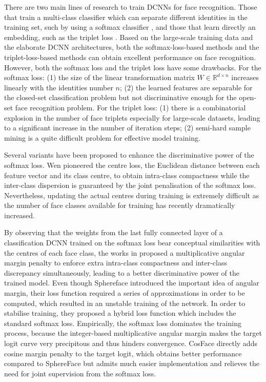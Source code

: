 \documentclass[10pt,twocolumn,letterpaper]{article}
\begin{document}
There are two main lines of research to train DCNNs for face recognition. Those that train a multi-class classifier which can separate different identities in the training set, such by using a softmax classifier \cite{taigman2014deepface,parkhi2015deep,cao2017vggface2}, and those that learn directly an embedding, such as the triplet loss \cite{schroff2015facenet}. Based on the large-scale training data and the elaborate DCNN architectures, both the softmax-loss-based methods \cite{cao2017vggface2} and the triplet-loss-based methods \cite{schroff2015facenet} can obtain excellent performance on face recognition. However, both the softmax loss and the triplet loss have some drawbacks. For the softmax loss: (1) the size of the linear transformation matrix $W \in \mathbb{R}^{d \times n}$ increases linearly with the identities number $n$; (2) the learned features are separable for the closed-set classification problem but not discriminative enough for the open-set face recognition problem. For the triplet loss: (1) there is a combinatorial explosion in the number of face triplets especially for large-scale datasets, leading to a significant increase in the number of iteration steps; (2) semi-hard sample mining is a quite difficult problem for effective model training.

Several variants \cite{wen2016discriminative,deng2017marginal,zhang2016range,liu2017sphereface,tencent2017CosineFace,wang2018additive,chen2017noisy,wen2018rethinkingGM,qi2018facepami} have been proposed to enhance the discriminative power of the softmax loss. Wen \etal \cite{wen2016discriminative} pioneered the centre loss, the Euclidean distance between each feature vector and its class centre, to obtain intra-class compactness while the inter-class dispersion is guaranteed by the joint penalisation of the softmax loss. Nevertheless, updating the actual centres during training is extremely difficult as the number of face classes available for training has recently dramatically increased.

By observing that the weights from the last fully connected layer of a classification DCNN trained on the softmax loss bear conceptual similarities with the centres of each face class, the works in \cite{liu2017sphereface,liu2016large} proposed a multiplicative angular margin penalty to enforce extra intra-class compactness and inter-class discrepancy simultaneously, leading to a better discriminative power of the trained model. Even though Sphereface \cite{liu2017sphereface} introduced the important idea of angular margin, their loss function required a series of approximations in order to be computed, which resulted in an unstable training of the network. In order to stabilise training, they proposed a hybrid loss function which includes the standard softmax loss. Empirically, the softmax loss dominates the training process, because the integer-based multiplicative angular margin makes the target logit curve very precipitous and thus hinders convergence. CosFace \cite{tencent2017CosineFace,wang2018additive} directly adds cosine margin penalty to the target logit, which obtains better performance compared to SphereFace but admits much easier implementation and relieves the need for joint supervision from the softmax loss. 
\end{document}
